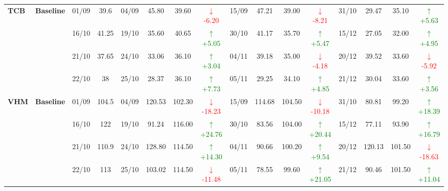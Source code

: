 {\begin{longtable}{llcc|cccc|cccc|cccc}
\multirow{4}{*}{\textbf{TCB}}
& \textbf{Baseline}
& 01/09 & 39.6 & 04/09 & 45.80 & 39.60 & \textcolor{red}{\(\downarrow\)-6.20} & 15/09 & 47.21 & 39.00 & \textcolor{red}{\(\downarrow\)-8.21} & 31/10 & 29.47 & 35.10 & \textcolor{green}{\(\uparrow\)+5.63} \\
& & 16/10 & 41.25 & 19/10 & 35.60 & 40.65 & \textcolor{green}{\(\uparrow\)+5.05} & 30/10 & 41.17 & 35.70 & \textcolor{green}{\(\uparrow\)+5.47} & 15/12 & 27.05 & 32.00 & \textcolor{green}{\(\uparrow\)+4.95} \\
& & 21/10 & 37.65 & 24/10 & 33.06 & 36.10 & \textcolor{green}{\(\uparrow\)+3.04} & 04/11 & 39.18 & 35.00 & \textcolor{red}{\(\downarrow\)-4.18} & 20/12 & 39.52 & 33.60 & \textcolor{red}{\(\downarrow\)-5.92} \\
& & 22/10 & 38 & 25/10 & 28.37 & 36.10 & \textcolor{green}{\(\uparrow\)+7.73} & 05/11 & 29.25 & 34.10 & \textcolor{green}{\(\uparrow\)+4.85} & 21/12 & 30.04 & 33.60 & \textcolor{green}{\(\uparrow\)+3.56} \\
\midrule

\multirow{4}{*}{\textbf{VHM}}
& \textbf{Baseline}
& 01/09 & 104.5 & 04/09 & 120.53 & 102.30 & \textcolor{red}{\(\downarrow\)-18.23} & 15/09 & 114.68 & 104.50 & \textcolor{red}{\(\downarrow\)-10.18} & 31/10 & 80.81 & 99.20 & \textcolor{green}{\(\uparrow\)+18.39} \\
& & 16/10 & 122 & 19/10 & 91.24 & 116.00 & \textcolor{green}{\(\uparrow\)+24.76} & 30/10 & 83.56 & 104.00 & \textcolor{green}{\(\uparrow\)+20.44} & 15/12 & 77.11 & 93.90 & \textcolor{green}{\(\uparrow\)+16.79} \\
& & 21/10 & 110.9 & 24/10 & 128.80 & 114.50 & \textcolor{green}{\(\uparrow\)+14.30} & 04/11 & 90.66 & 100.20 & \textcolor{green}{\(\uparrow\)+9.54} & 20/12 & 120.13 & 101.50 & \textcolor{red}{\(\downarrow\)-18.63} \\
& & 22/10 & 113 & 25/10 & 103.02 & 114.50 & \textcolor{red}{\(\downarrow\)-11.48} & 05/11 & 78.55 & 99.60 & \textcolor{green}{\(\uparrow\)+21.05} & 21/12 & 90.46 & 101.50 & \textcolor{green}{\(\uparrow\)+11.04} \\
\midrule


\end{longtable}}
